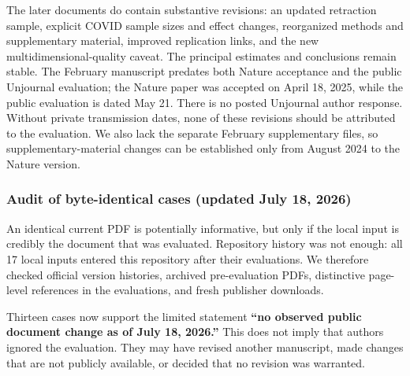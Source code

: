\documentclass[
  11pt,
  letterpaper,
]{article}
\begin{document}
The later documents do contain substantive revisions: an updated
retraction sample, explicit COVID sample sizes and effect changes,
reorganized methods and supplementary material, improved replication
links, and the new multidimensional-quality caveat. The principal
estimates and conclusions remain stable. The February manuscript
predates both Nature acceptance and the public Unjournal evaluation; the
Nature paper was accepted on April 18, 2025, while the public evaluation
is dated May 21. There is no posted Unjournal author response. Without
private transmission dates, none of these revisions should be attributed
to the evaluation. We also lack the separate February supplementary
files, so supplementary-material changes can be established only from
August 2024 to the Nature version.

\subsubsection{Audit of byte-identical cases (updated July 18,
2026)}\label{audit-of-byte-identical-cases-updated-july-18-2026}

An identical current PDF is potentially informative, but only if the
local input is credibly the document that was evaluated. Repository
history was not enough: all 17 local inputs entered this repository
after their evaluations. We therefore checked official version
histories, archived pre-evaluation PDFs, distinctive page-level
references in the evaluations, and fresh publisher downloads.

Thirteen cases now support the limited statement \textbf{``no observed
public document change as of July 18, 2026.''} This does not imply that
authors ignored the evaluation. They may have revised another
manuscript, made changes that are not publicly available, or decided
that no revision was warranted.
\end{document}
